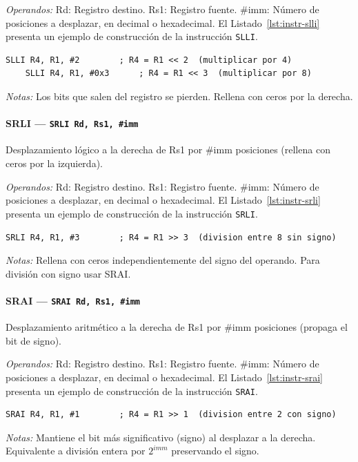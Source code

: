 \documentclass[../main.tex]{subfiles}
\begin{document}
\textit{Operandos:} Rd: Registro destino. Rs1: Registro fuente. \#imm: Número de posiciones a desplazar, en decimal o hexadecimal.
El Listado~\ref{lst:instr-slli} presenta un ejemplo de construcción de la instrucción \texttt{SLLI}.

\begin{lstlisting}[caption={SLLI},label={lst:instr-slli}]
	SLLI R4, R1, #2        ; R4 = R1 << 2  (multiplicar por 4)
	SLLI R4, R1, #0x3      ; R4 = R1 << 3  (multiplicar por 8)
\end{lstlisting}
\textit{Notas:} Los bits que salen del registro se pierden. Rellena con ceros por la derecha.

\paragraph*{SRLI --- \texttt{SRLI Rd, Rs1, \#imm}}
Desplazamiento lógico a la derecha de Rs1 por \#imm posiciones (rellena con ceros por la izquierda).

\textit{Operandos:} Rd: Registro destino. Rs1: Registro fuente. \#imm: Número de posiciones a desplazar, en decimal o hexadecimal.
El Listado~\ref{lst:instr-srli} presenta un ejemplo de construcción de la instrucción \texttt{SRLI}.

\begin{lstlisting}[caption={SRLI},label={lst:instr-srli}]
	SRLI R4, R1, #3        ; R4 = R1 >> 3  (division entre 8 sin signo)
\end{lstlisting}
\textit{Notas:} Rellena con ceros independientemente del signo del operando. Para división con signo usar SRAI.

\paragraph*{SRAI --- \texttt{SRAI Rd, Rs1, \#imm}}
Desplazamiento aritmético a la derecha de Rs1 por \#imm posiciones (propaga el bit de signo).

\textit{Operandos:} Rd: Registro destino. Rs1: Registro fuente. \#imm: Número de posiciones a desplazar, en decimal o hexadecimal.
El Listado~\ref{lst:instr-srai} presenta un ejemplo de construcción de la instrucción \texttt{SRAI}.

\begin{lstlisting}[caption={SRAI},label={lst:instr-srai}]
	SRAI R4, R1, #1        ; R4 = R1 >> 1  (division entre 2 con signo)
\end{lstlisting}
\textit{Notas:} Mantiene el bit más significativo (signo) al desplazar a la derecha. Equivalente a división entera por $2^{\mathit{imm}}$ preservando el signo.
\end{document}

